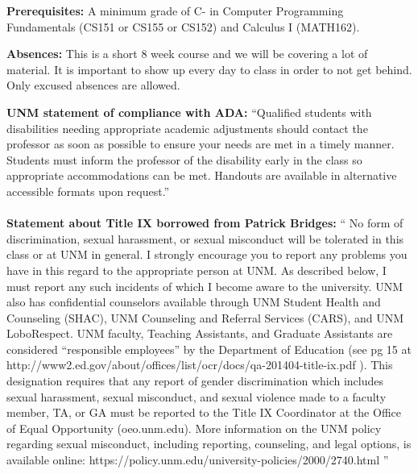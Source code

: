 \documentclass[18pt]{letter}
\begin{document}
{\textbf{Prerequisites:} A minimum grade of C- in Computer
Programming Fundamentals (CS151 or CS155 or CS152) and Calculus I
(MATH162).

\textbf{Absences:} This is a short 8 week course and we will be
covering a lot of material. It is important to show up every day to
class in order to not get behind. Only excused absences are allowed.

\textbf{UNM statement of compliance with ADA:}
“Qualified students with disabilities needing appropriate
academic adjustments should contact the professor as soon as possible to ensure your needs are met in
a timely manner.  Students must inform the professor of the disability early in the class so appropriate
accommodations can be met.  Handouts are available in alternative accessible formats upon request.”\\\\
\textbf{Statement about Title IX borrowed from Patrick Bridges:}
“
No form of discrimination, sexual 
harassment, or sexual misconduct will be tolerated in this class or at UNM in general. I strongly 
encourage you to report any problems you have in this regard to the appropriate person at UNM.  As 
described below, I must report any such incidents of which I become aware to the university.  UNM 
also has confidential counselors available through UNM Student Health and Counseling (SHAC), 
UNM Counseling and Referral Services (CARS), and UNM LoboRespect. UNM faculty, Teaching 
Assistants, and Graduate Assistants are considered “responsible employees” by the Department of 
Education (see pg 15 at 
http://www2.ed.gov/about/offices/list/ocr/docs/qa-201404-title-ix.pdf
).
This designation requires that any report of gender discrimination which includes sexual harassment, 
sexual misconduct, and sexual violence made to a faculty member, TA, or GA must be reported to the 
Title IX Coordinator at the Office of Equal Opportunity (oeo.unm.edu).
More information on the UNM policy regarding sexual misconduct, including reporting, counseling, 
and legal options, is available online:
https://policy.unm.edu/university-policies/2000/2740.html
”
}
\end{document}
